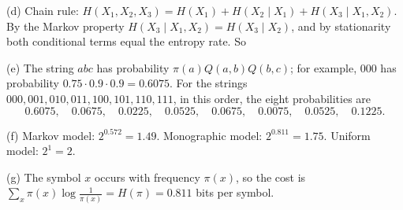 \begin{enumerate}[resume*=quiz]
\begin{solution}
(d) Chain rule: $H(X_1,X_2,X_3)=H(X_1)+H(X_2\mid X_1)+H(X_3\mid X_1,X_2)$. By the Markov property $H(X_3\mid X_1,X_2)=H(X_3\mid X_2)$, and by stationarity both conditional terms equal the entropy rate. So

(e) The string $abc$ has probability $\pi(a)Q(a,b)Q(b,c)$; for example, $000$ has probability $0.75\cdot0.9\cdot0.9=0.6075$. For the strings $000,001,010,011,100,101,110,111$, in this order, the eight probabilities are
\[
0.6075,\quad0.0675,\quad0.0225,\quad0.0525,\quad0.0675,\quad0.0075,\quad0.0525,\quad0.1225 .
\]

(f) Markov model: $2^{0.572}=1.49$. Monographic model: $2^{0.811}=1.75$. Uniform model: $2^1=2$.

(g) The symbol $x$ occurs with frequency $\pi(x)$, so the cost is $\sum_x\pi(x)\log\frac1{\pi(x)}=H(\pi)=0.811$ bits per symbol.
\end{solution}
\end{enumerate}
